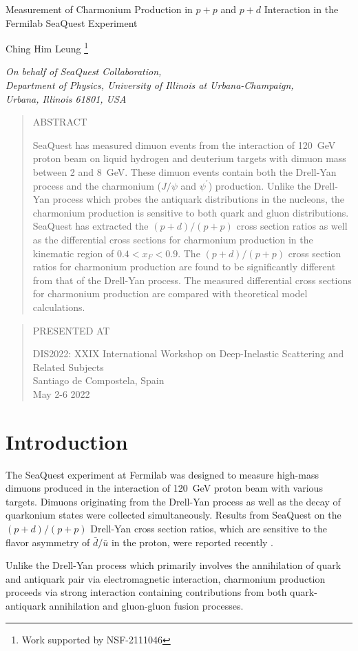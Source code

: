 \documentclass[10pt, a4paper]{article}
\def\Title#1{\begin{center} {\Large #1 } \end{center}}
\def\Author#1{\begin{center}{ \sc #1} \end{center}}
\def\Address#1{\begin{center}{ \it #1} \end{center}}
\newcommand\pubblock{\rightline{\begin{tabular}{l} Proceedings of DIS2022\\ 
         \pubdate  \end{tabular}}}
\newenvironment{Abstract}{\begin{quotation} \begin{center} 
             \large ABSTRACT \end{center}\bigskip 
      \begin{large}}{\end{large}\end{quotation}}
\newenvironment{Presented}{\begin{quotation} \begin{center} 
             PRESENTED AT\end{center}\bigskip 
      \begin{center}\begin{large}}{\end{large}\end{center} \end{quotation}}
\newcommand\pubdate{\today}
\def\affiliation{
On behalf of SeaQuest Collaboration, \\
Department of Physics, University of Illinois at Urbana-Champaign, \\Urbana, Illinois 61801, USA}
\def\support{\footnote{Work supported by NSF-2111046}}
\newcommand{\conference}{DIS2022: XXIX International Workshop on Deep-Inelastic Scattering and Related Subjects\\
Santiago de Compostela, Spain\\
May 2-6 2022}
\begin{document}
\large
\begin{titlepage}
	\pubblock


	\vfill
	\Title{Measurement of Charmonium Production in $p + p$ and $p + d$ Interaction in the Fermilab SeaQuest Experiment}
	\vfill

	\Author{Ching Him Leung \support}
	\Address{\affiliation}
	\vfill

	\begin{Abstract}
		SeaQuest has measured dimuon events from the interaction of \SI{120}{\GeV} proton
		beam on liquid hydrogen and deuterium targets with dimuon mass between \num{2}
		and \SI{8}{\GeV}. These dimuon events contain both the Drell-Yan process and the
		charmonium ($J/\psi$ and $\psi^\prime$) production. Unlike the Drell-Yan process
		which probes the antiquark distributions in the nucleons, the charmonium production
		is sensitive to both quark and gluon distributions. SeaQuest has extracted the
		$(p+d)/(p+p)$ cross section ratios as well as the differential cross sections for
		charmonium production in the kinematic region of $0.4 < x_F < 0.9$. The $(p+d)/(p+p)$
		cross section ratios for charmonium production are found to be significantly different
		from that of the Drell-Yan process. The measured differential cross sections for
		charmonium production are compared with theoretical model calculations.
	\end{Abstract}

	\vfill

	\begin{Presented}
		\conference
	\end{Presented}
	\vfill
\end{titlepage}

\setcounter{footnote}{0}
\normalsize


\section{Introduction}
\label{sec:intro}
The SeaQuest experiment at Fermilab was designed to measure high-mass dimuons
produced in the interaction of \SI{120}{\GeV} proton beam with various targets.
Dimuons originating from the Drell-Yan process \cite{drell1970} as well as the
decay of quarkonium states were collected simultaneously. Results from SeaQuest
on the $(p+d)/(p+p)$ Drell-Yan cross section ratios, which are sensitive to
the flavor asymmetry of $\bar{d}/\bar{u}$ in the proton, were reported recently
\cite{dove2021}.

Unlike the Drell-Yan process which primarily involves the annihilation of quark
and antiquark pair via electromagnetic interaction, charmonium production proceeds
via strong interaction containing contributions from both quark-antiquark
annihilation and gluon-gluon fusion processes. 
\end{document}
